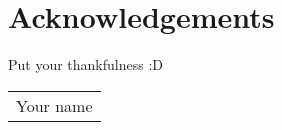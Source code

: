 \chapter*{Acknowledgements}

Put your thankfulness :D

\bigskip
\hfill
\begin{tabular}{r@{}}
Your name
\end{tabular}

